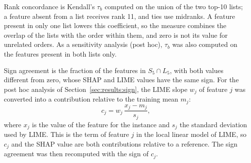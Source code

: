 Rank concordance is Kendall's $\tau_b$ \cite{kendall1945treatment} computed on the union
of the two top-10 lists; a feature absent from a list receives rank 11, and ties use
midranks. A feature present in only one list lowers this coefficient, so the measure
combines the overlap of the lists with the order within them, and zero is not its value
for unrelated orders. As a sensitivity analysis (post hoc), $\tau_b$ was also computed on
the features present in both lists only.

Sign agreement is the fraction of the features in $S_5 \cap L_5$, with both values
different from zero, whose SHAP and LIME values have the same sign. For the post hoc
analysis of Section~\ref{sec:results:sign}, the LIME slope $w_j$ of feature $j$ was
converted into a contribution relative to the training mean $m_j$:
\begin{equation}
c_j = w_j \, \frac{x_j - m_j}{s_j},
\label{eq:contribution}
\end{equation}
where $x_j$ is the value of the feature for the instance and $s_j$ the standard deviation
used by LIME. This is the term of feature $j$ in the local linear model of LIME, so
$c_j$ and the SHAP value are both contributions relative to a reference. The sign
agreement was then recomputed with the sign of $c_j$.

